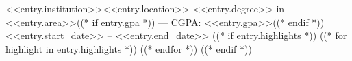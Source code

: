  \resumeSubheading
    {<<entry.institution>>}{<<entry.location>>}
    {<<entry.degree>> in <<entry.area>>((* if entry.gpa *)) --- CGPA: <<entry.gpa>>((* endif *))}{<<entry.start_date>> -- <<entry.end_date>>}
    ((* if entry.highlights *))
    \resumeListStart
      ((* for highlight in entry.highlights *))
      ((* endfor *))
    \resumeListEnd
    ((* endif *))
